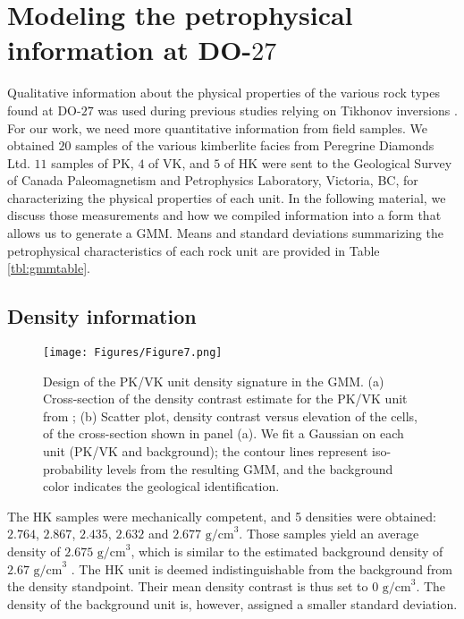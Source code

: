 \documentclass[paper, twocolumn]{geophysics} %
\begin{document}
\section{Modeling the petrophysical information at DO-$27$}

Qualitative information about the physical properties of the various rock types found at DO-$27$ was used during previous studies relying on Tikhonov inversions \citep{TKCpaper,TKCEM,TKCIP}. For our work, we need more quantitative information from field samples. We obtained $20$ samples of the various kimberlite facies from Peregrine Diamonds Ltd. $11$ samples of PK, $4$ of VK, and $5$ of HK were sent to the Geological Survey of Canada Paleomagnetism and Petrophysics Laboratory, Victoria, BC, for characterizing the physical properties of each unit. In the following material, we discuss those measurements and how we compiled information into a form that allows us to generate a GMM. Means and standard deviations summarizing the petrophysical characteristics of each rock unit are provided in Table \ref{tbl:gmmtable}.

\subsection{Density information} \label{pkvkdensitysection}

\begin{figure*}%
\centering
\texttt{[image: Figures/Figure7.png]}
\caption{Design of the PK/VK unit density signature in the GMM. (a) Cross-section of the density contrast estimate for the PK/VK unit from \citet{TechnicalReport}; (b) Scatter plot, density contrast versus elevation of the cells, of the cross-section shown in panel (a). We fit a Gaussian on each unit (PK/VK and background); the contour lines represent iso-probability levels from the resulting GMM, and the background color indicates the geological identification.}
\label{fig:Figure7.png}
\end{figure*}%

The HK samples were mechanically competent, and 5 densities were obtained: $2.764$, $2.867$, $2.435$, $2.632$ and $2.677 \text{ g/cm}^3$. Those samples yield an average density of $2.675 \text{ g/cm}^3$, which is similar to the estimated background density of $2.67 \text{ g/cm}^3$ \citep{TKCpaper}. The HK unit is deemed indistinguishable from the background from the density standpoint. Their mean density contrast is thus set to $0 \text{ g/cm}^3$. The density of the background unit is, however, assigned a smaller standard deviation.
\end{document}
